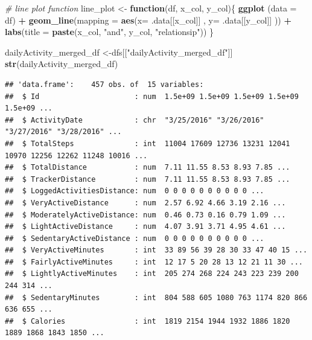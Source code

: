 \documentclass[
]{article}
\newenvironment{Shaded}{\begin{snugshade}}{\end{snugshade}}
\newcommand{\AttributeTok}[1]{\textcolor[rgb]{0.13,0.29,0.53}{#1}}
\newcommand{\CommentTok}[1]{\textcolor[rgb]{0.56,0.35,0.01}{\textit{#1}}}
\newcommand{\ControlFlowTok}[1]{\textcolor[rgb]{0.13,0.29,0.53}{\textbf{#1}}}
\newcommand{\FunctionTok}[1]{\textcolor[rgb]{0.13,0.29,0.53}{\textbf{#1}}}
\newcommand{\NormalTok}[1]{#1}
\newcommand{\OtherTok}[1]{\textcolor[rgb]{0.56,0.35,0.01}{#1}}
\newcommand{\SpecialCharTok}[1]{\textcolor[rgb]{0.81,0.36,0.00}{\textbf{#1}}}
\newcommand{\StringTok}[1]{\textcolor[rgb]{0.31,0.60,0.02}{#1}}
\begin{document}
\begin{Shaded}
\begin{Highlighting}[]
\CommentTok{\# line plot function }
\NormalTok{line\_plot }\OtherTok{\textless{}{-}} \ControlFlowTok{function}\NormalTok{(df, x\_col, y\_col)\{}
  \FunctionTok{ggplot}\NormalTok{ (}\AttributeTok{data =}\NormalTok{ df) }\SpecialCharTok{+}
    \FunctionTok{geom\_line}\NormalTok{(}\AttributeTok{mapping =} \FunctionTok{aes}\NormalTok{(}\AttributeTok{x=}\NormalTok{ .data[[x\_col]] , }\AttributeTok{y=}\NormalTok{ .data[[y\_col]] )) }\SpecialCharTok{+}
    \FunctionTok{labs}\NormalTok{(}\AttributeTok{title =} \FunctionTok{paste}\NormalTok{(x\_col, }\StringTok{"and"}\NormalTok{, y\_col, }\StringTok{"relationsip"}\NormalTok{))}
\NormalTok{\}}
\end{Highlighting}
\end{Shaded}

\begin{Shaded}
\begin{Highlighting}[]
\NormalTok{dailyActivity\_merged\_df }\OtherTok{\textless{}{-}}\NormalTok{dfs[[}\StringTok{"dailyActivity\_merged\_df"}\NormalTok{]]}
\FunctionTok{str}\NormalTok{(dailyActivity\_merged\_df)}
\end{Highlighting}
\end{Shaded}

\begin{verbatim}
## 'data.frame':    457 obs. of  15 variables:
##  $ Id                      : num  1.5e+09 1.5e+09 1.5e+09 1.5e+09 1.5e+09 ...
##  $ ActivityDate            : chr  "3/25/2016" "3/26/2016" "3/27/2016" "3/28/2016" ...
##  $ TotalSteps              : int  11004 17609 12736 13231 12041 10970 12256 12262 11248 10016 ...
##  $ TotalDistance           : num  7.11 11.55 8.53 8.93 7.85 ...
##  $ TrackerDistance         : num  7.11 11.55 8.53 8.93 7.85 ...
##  $ LoggedActivitiesDistance: num  0 0 0 0 0 0 0 0 0 0 ...
##  $ VeryActiveDistance      : num  2.57 6.92 4.66 3.19 2.16 ...
##  $ ModeratelyActiveDistance: num  0.46 0.73 0.16 0.79 1.09 ...
##  $ LightActiveDistance     : num  4.07 3.91 3.71 4.95 4.61 ...
##  $ SedentaryActiveDistance : num  0 0 0 0 0 0 0 0 0 0 ...
##  $ VeryActiveMinutes       : int  33 89 56 39 28 30 33 47 40 15 ...
##  $ FairlyActiveMinutes     : int  12 17 5 20 28 13 12 21 11 30 ...
##  $ LightlyActiveMinutes    : int  205 274 268 224 243 223 239 200 244 314 ...
##  $ SedentaryMinutes        : int  804 588 605 1080 763 1174 820 866 636 655 ...
##  $ Calories                : int  1819 2154 1944 1932 1886 1820 1889 1868 1843 1850 ...
\end{verbatim}
\end{document}
